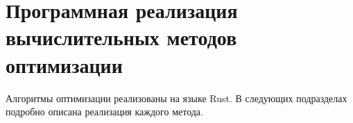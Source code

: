 \section{Программная реализация вычислительных методов оптимизации}
Алгоритмы оптимизации реализованы на языке Rust. В следующих подразделах подробно описана реализация каждого метода.
